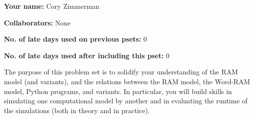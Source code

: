 \documentclass[11pt]{article}
\begin{document}

\textbf{Your name: } Cory Zimmerman

\textbf{Collaborators: } None

\textbf{No. of late days used on previous psets: } 0

\textbf{No. of late days used after including this pset: } 0


The purpose of this problem set is to solidify your understanding of the RAM model (and variants), and the relations between the RAM model, the Word-RAM model, Python programs, and variants. In particular, you will build skills in simulating one computational model by another and in evaluating the runtime of the simulations (both in theory and in practice).
\end{document}
